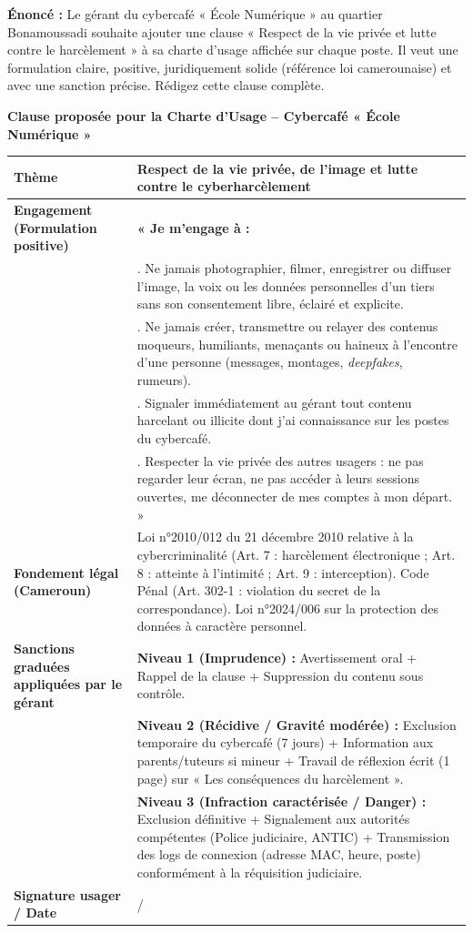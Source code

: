 \documentclass[11pt]{article}
\begin{document}
\begin{exoresolu}
\textbf{Énoncé :} Le gérant du cybercafé « École Numérique » au quartier Bonamoussadi souhaite ajouter une clause « Respect de la vie privée et lutte contre le harcèlement » à sa charte d'usage affichée sur chaque poste. Il veut une formulation claire, positive, juridiquement solide (référence loi camerounaise) et avec une sanction précise. Rédigez cette clause complète.

\tcblower
\textbf{Clause proposée pour la Charte d'Usage -- Cybercafé « École Numérique »}

\begin{center}
\begin{tabularx}{\linewidth}{|>{\bfseries}l|X|}
\hline
\textbf{Thème} & \textbf{Respect de la vie privée, de l'image et lutte contre le cyberharcèlement} \\
\hline
\textbf{Engagement (Formulation positive)} & \textbf{« Je m'engage à :} \\
& \quad 1. Ne jamais photographier, filmer, enregistrer ou diffuser l'image, la voix ou les données personnelles d'un tiers sans son consentement libre, éclairé et explicite. \\
& \quad 2. Ne jamais créer, transmettre ou relayer des contenus moqueurs, humiliants, menaçants ou haineux à l'encontre d'une personne (messages, montages, \emph{deepfakes}, rumeurs). \\
& \quad 3. Signaler immédiatement au gérant tout contenu harcelant ou illicite dont j'ai connaissance sur les postes du cybercafé. \\
& \quad 4. Respecter la vie privée des autres usagers : ne pas regarder leur écran, ne pas accéder à leurs sessions ouvertes, me déconnecter de mes comptes à mon départ. » \\
\hline
\textbf{Fondement légal (Cameroun)} & Loi n°2010/012 du 21 décembre 2010 relative à la cybercriminalité (Art. 7 : harcèlement électronique ; Art. 8 : atteinte à l'intimité ; Art. 9 : interception). Code Pénal (Art. 302-1 : violation du secret de la correspondance). Loi n°2024/006 sur la protection des données à caractère personnel. \\
\hline
\textbf{Sanctions graduées appliquées par le gérant} & \textbf{Niveau 1 (Imprudence) :} Avertissement oral + Rappel de la clause + Suppression du contenu sous contrôle. \\
& \textbf{Niveau 2 (Récidive / Gravité modérée) :} Exclusion temporaire du cybercafé (7 jours) + Information aux parents/tuteurs si mineur + Travail de réflexion écrit (1 page) sur « Les conséquences du harcèlement ». \\
& \textbf{Niveau 3 (Infraction caractérisée / Danger) :} Exclusion définitive + Signalement aux autorités compétentes (Police judiciaire, ANTIC) + Transmission des logs de connexion (adresse MAC, heure, poste) conformément à la réquisition judiciaire. \\
\hline
\textbf{Signature usager / Date} & \hrulefill \quad / \quad \hrulefill \\
\hline
\end{tabularx}
\end{center}


\end{exoresolu}
\end{document}
